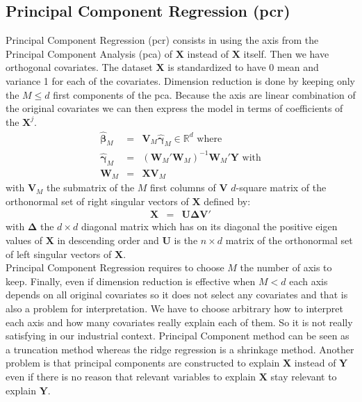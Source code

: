 \documentclass[12pt,a4paper]{report}
\begin{document}
		\subsection{Principal Component Regression ({\sc pcr})}
	Principal Component Regression ({\sc pcr})\cite{jackson2005user} consists in using the axis from the Principal Component Analysis ({\sc pca}) of $\boldsymbol{X}$ instead of $\boldsymbol{X}$ itself. Then we have orthogonal covariates. The dataset $\boldsymbol{X}$ is standardized to have 0 mean and variance 1 for each of the covariates. Dimension reduction is done by keeping only the $M \leq d$ first components of the {\sc pca}. Because the axis are linear combination of the original covariates we can then express the model in terms of coefficients of the $\boldsymbol{X}^j$.\\
	\begin{eqnarray}
		\hat{\boldsymbol{\beta}}_M&=&\boldsymbol{V}_M\hat{\boldsymbol{\gamma}}_M \in \mathbb{R}^d \textrm{ where}\\
		\hat{\boldsymbol{\gamma}}_M&=&(\boldsymbol{W}_M'\boldsymbol{W}_M)^{-1}\boldsymbol{W}_M'\boldsymbol{Y} \textrm{ with} \\
		\boldsymbol{W}_M&=&\boldsymbol{X}\boldsymbol{V}_M
	\end{eqnarray}
	with $\boldsymbol{V}_M$ the submatrix of the $M$ first columns of $\boldsymbol{V}$ $d$-square matrix of the orthonormal set of right singular vectors of $\boldsymbol{X}$ defined by:
	\begin{eqnarray}
		\boldsymbol{X}&=&\boldsymbol{U}\boldsymbol{\Delta}\boldsymbol{V}'
	\end{eqnarray}
	with $\boldsymbol{\Delta}$ the $d\times d$ diagonal matrix which has on its diagonal the positive eigen values of $\boldsymbol{X}$ in descending order and $\boldsymbol{U}$ is the $n\times d$ matrix of the orthonormal set of left singular vectors of $\boldsymbol{X}$.\\
	
	Principal Component Regression requires to choose $M$ the number of axis to keep. Finally, even if dimension reduction is effective when $M<d$ each axis depends on all original covariates so it does not select any covariates and that is also a problem for interpretation. We have to choose arbitrary how to interpret each axis and how many covariates really explain each of them. So it is not really satisfying in our industrial context. Principal Component method can be seen as a truncation method whereas the ridge regression is a shrinkage method. Another problem is that principal components are constructed to explain $\boldsymbol{X}$ instead of $\boldsymbol{Y}$ even if there is no reason that relevant variables to explain $\boldsymbol{X}$ stay relevant to explain $\boldsymbol{Y}$. \\
\end{document}
